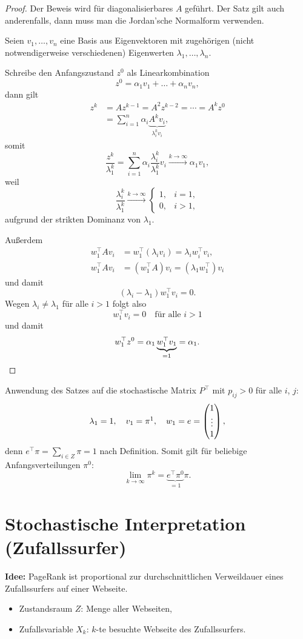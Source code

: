 \begin{proof}
  Der Beweis wird für diagonalisierbares $A$ geführt. Der Satz gilt auch
  anderenfalls, dann muss man die Jordan'sche Normalform verwenden.

  Seien $v_1, \ldots, v_n$ eine Basis aus Eigenvektoren mit zugehörigen (nicht
  notwendigerweise verschiedenen) Eigenwerten $\lambda_1, \ldots, \lambda_n$.

  Schreibe den Anfangszustand $z^0$ als Linearkombination
  \[ z^0 = \alpha_1 v_1 + \ldots + \alpha_n v_n, \]
  dann gilt
  \begin{align*}
    z^k &= A z^{k-1} = A^2 z^{k-2} = \cdots = A^k z^0 \\
        &= \sum_{i=1}^n \alpha_i \underbrace{A^k v_i}_{\lambda_i^k v_i},
  \end{align*}
  somit
  \[ \frac{z^k}{\lambda_1^k} = \sum_{i=1}^n \alpha_i
    \frac{\lambda_i^k}{\lambda_1^k} v_i
    \xrightarrow{k \to \infty}
    \alpha_1 v_1, \]
  weil
  \[ \frac{\lambda_i^k}{\lambda_1^k} \xrightarrow{k \to \infty}
    \begin{cases}
      1, & i = 1, \\
      0, & i > 1, 
    \end{cases}
  \]
  aufgrund der strikten Dominanz von $\lambda_1$.

  Außerdem
  \begin{align*}
    w_1^\top A v_i &= w_1^\top (\lambda_i v_i) = \lambda_i w_i^\top v_i, \\
    w_1^\top A v_i &= (w_1^\top A) v_i = (\lambda_1 w_1^\top) v_i 
  \end{align*}
  und damit
  \[ (\lambda_i - \lambda_1) w_1^\top v_i = 0. \]
  Wegen $\lambda_i \ne \lambda_1$ für alle $i > 1$ folgt also
  \[ w_1^\top v_i = 0 \quad \text{für alle } i > 1 \]
  und damit
  \[ w_1^\top z^0 = \alpha_1 \underbrace{w_1^\top v_1}_{= 1} = \alpha_1.
    \qedhere \]
\end{proof}

Anwendung des Satzes auf die stochastische Matrix $P^\top$ mit $p_{ij} > 0$ für
alle $i$, $j$:
\[ \lambda_1 = 1, \quad v_1 = \pi\footnotemark, \quad
  w_1 = e = \pmat{1 \\ \vdots \\ 1}, \]
denn $e^\top \pi = \sum_{i \in Z} \pi = 1$ nach Definition. Somit gilt für
beliebige Anfangsverteilungen $\pi^0$:
\[ \lim_{k \to \infty} \pi^k = \underbrace{e^\top \pi^0}_{=1} \pi. \]

\section{Stochastische Interpretation (Zufallssurfer)}
\textbf{Idee:} PageRank ist proportional zur durchschnittlichen Verweildauer
eines Zufallssurfers auf einer Webseite.
\begin{itemize}
\item Zustandsraum $Z$: Menge aller Webseiten,
\item Zufallsvariable $X_k$: $k$-te besuchte Webseite des Zufallssurfers.
\end{itemize}


